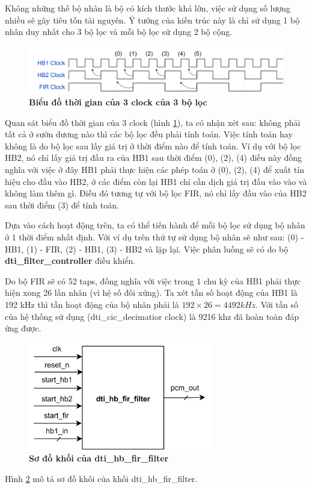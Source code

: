 Không những thế bộ nhân là bộ có kích thước khá lớn, việc sử dụng số lượng nhiều sẽ gây tiêu tốn tài nguyên. Ý tưởng của kiến trúc này là chỉ sử dụng 1 bộ nhân duy nhất cho 3 bộ lọc và mỗi bộ lọc sử dụng 2 bộ cộng.

\begin{figure}[H]
    \centering
    \includegraphics[width=16cm]{Images/Chuong4/hb_fir/timing.png}
    \caption[Biểu đồ thời gian của 3 clock của 3 bộ lọc]{\bfseries \fontsize{12pt}{0pt}\selectfont Biểu đồ thời gian của 3 clock của 3 bộ lọc}
    \label{3clock}
\end{figure}

Quan sát biểu đồ thời gian của 3 clock (hình \ref{3clock}), ta có nhận xét sau: không phải tất cả ở sườn dương nào thì các bộ lọc đều phải tính toán. Việc tính toán hay không là do bộ lọc sau lấy giá trị ở thời điểm nào để tính toán. Ví dụ với bộ lọc HB2, nó chỉ lấy giá trị đầu ra của HB1 sau thời điểm (0), (2), (4) điều này đồng nghĩa với việc ở đây HB1 phải thực hiện các phép toán ở (0), (2), (4) để xuất tín hiệu cho đầu vào HB2, ở các điểm còn lại HB1 chỉ cần dịch giá trị đầu vào vào và không làm thêm gì. Điều đó tương tự với bộ lọc FIR, nó chỉ lấy đầu vào của HB2  sau thời điểm (3) để tính toán.

Dựa vào cách hoạt động trên, ta có thể tiến hành để mỗi bộ lọc sử dụng bộ nhân ở 1 thời điểm nhất định. Với ví dụ trên thứ tự sử dụng bộ nhân sẽ như sau: (0) - HB1, (1) - FIR, (2) - HB1, (3) - HB2 và lặp lại. Việc phân luồng sẽ có do bộ \textbf{dti\_filter\_controller} điều khiển.

Do bộ FIR sẽ có 52 taps, đồng nghĩa với việc trong 1 chu kỳ của HB1 phải thực hiện xong 26 lần nhân (vì hệ số đối xứng). Ta xét tần số hoạt động của HB1 là 192 kHz thì tần hoạt động của bộ nhân phải là $192 \times 26 = 4492 kHz$. Với tần số của hệ thống sử dụng (dti\_cic\_decimatior clock) là 9216 khz đã hoàn toàn đáp ứng được.

\begin{figure}[H]
    \centering
    \includegraphics[width=8cm]{Images/Chuong4/hb_fir/hb_fir_top.png}
    \caption[Sơ đồ khối của dti\_cic\_decimator]{\bfseries \fontsize{12pt}{0pt}\selectfont Sơ đồ khối của dti\_hb\_fir\_filter}
    \label{hb_fir_top}
\end{figure}
Hình \ref{hb_fir_top} mô tả sơ đồ khối của khối dti\_hb\_fir\_filter.

\newpage